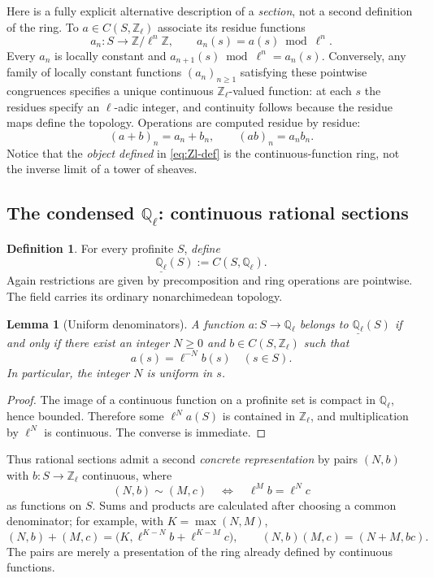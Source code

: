 \documentclass[11pt,a4paper]{article}
\numberwithin{equation}{section}
\newtheorem{lemma}[theorem]{Lemma}
\theoremstyle{definition}
\newtheorem{definition}[theorem]{Definition}
\theoremstyle{remark}
\newcommand{\ringunder}[1]{\underline{#1}}
\begin{document}
Here is a fully explicit alternative description of a \emph{section},
not a second definition of the ring.  To $a\in C(S,\mathbb Z_\ell)$
associate its residue functions
\[
   a_n:S\longrightarrow\mathbb Z/\ell^n\mathbb Z,
   \qquad a_n(s)=a(s)\bmod\ell^n.
\]
Every $a_n$ is locally constant and
$a_{n+1}(s)\bmod\ell^n=a_n(s)$.  Conversely, any family of locally
constant functions $(a_n)_{n\geq1}$ satisfying these pointwise
congruences specifies a unique continuous $\mathbb Z_\ell$-valued
function: at each $s$ the residues specify an $\ell$-adic integer, and
continuity follows because the residue maps define the topology.
Operations are computed residue by residue:
\[
 (a+b)_n=a_n+b_n,\qquad (ab)_n=a_nb_n.
\]
Notice that the \emph{object defined} in \eqref{eq:Zl-def} is the
continuous-function ring, not the inverse limit of a tower of sheaves.

\subsection{\texorpdfstring{The condensed $\mathbb Q_\ell$}{The condensed Ql}: continuous rational sections}

\begin{definition}\label{def:Ql}
For every profinite $S$, \emph{define}
\begin{equation}\label{eq:Ql-def}
   \boxed{\quad\ringunder{\mathbb Q_\ell}(S):=C(S,\mathbb Q_\ell).\quad}
\end{equation}
Again restrictions are given by precomposition and ring operations
are pointwise.  The field carries its ordinary nonarchimedean topology.
\end{definition}

\begin{lemma}[Uniform denominators]\label{lem:uniform-denominator}
A function $a:S\to\mathbb Q_\ell$ belongs to
$\ringunder{\mathbb Q_\ell}(S)$ if and only if there exist an integer
$N\geq0$ and $b\in C(S,\mathbb Z_\ell)$ such that
\[
                   a(s)=\ell^{-N}b(s)\quad(s\in S).
\]
In particular, the integer $N$ is \emph{uniform in $s$}.
\end{lemma}
\begin{proof}
The image of a continuous function on a profinite set is compact in
$\mathbb Q_\ell$, hence bounded.  Therefore some $\ell^N a(S)$ is
contained in $\mathbb Z_\ell$, and multiplication by $\ell^N$ is
continuous.  The converse is immediate.
\end{proof}

Thus rational sections admit a second \emph{concrete representation}
by pairs $(N,b)$ with $b:S\to\mathbb Z_\ell$ continuous, where
\[
  (N,b)\sim(M,c)\quad\Longleftrightarrow\quad
                     \ell^M b=\ell^N c
\]
as functions on $S$.  Sums and products are calculated after choosing
a common denominator; for example, with $K=\max(N,M)$,
\[
 (N,b)+(M,c)=\bigl(K,\ell^{K-N}b+\ell^{K-M}c\bigr),\qquad
 (N,b)(M,c)=(N+M,bc).
\]
The pairs are merely a presentation of the ring already defined by
continuous functions.
\end{document}
